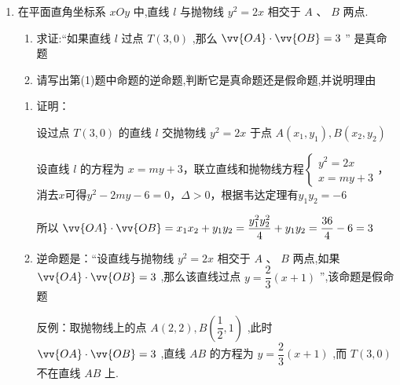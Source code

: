 \begin{enumerate}
\begin{jieda}
        设线段 ${AB}$ 的中点为 $M$ 到 $y$ 轴的距离为 $d$，由抛物线定义和梯形中位线性质可知, $2\left( {d + \dfrac{1}{4}}\right)  = \left| {AF}\right|  + \left| {BF}\right|  \geq  3$ ,即 $d \geq  \dfrac{5}{4}$ ,
        从而点 $M$ 到 $y$ 轴的最短距离为 $\dfrac{5}{4}$，此时 $A,B,F$ 三点共线
        
        故有$3 = |AB| = \dfrac{1}{sin^2\alpha}$，解得$sin\alpha = \dfrac{\sqrt{3}}{3}$，因此直线$AB$的斜率为$\pm \dfrac{\sqrt{2}}{2}$，故$AB: y = \pm \dfrac{\sqrt{2}}{2}\left(x-\dfrac{1}{2}\right)$，即${4x} - 4\sqrt{2}y - 1 = 0$ 或 ${4x} + 4\sqrt{2}y - 1 = 0$
    \end{jieda}


    \item 在平面直角坐标系 ${xOy}$ 中,直线 $l$ 与抛物线 ${y}^{2} = {2x}$ 相交于 $A\text{ 、 }B$ 两点.
    \begin{enumerate}
        \item 求证:“如果直线 $l$ 过点 $T\left( {3,0}\right)$ ,那么 $\vv{OA} \cdot  \vv{OB} = 3$ ” 是真命题
        \item 请写出第(1)题中命题的逆命题,判断它是真命题还是假命题,并说明理由
    \end{enumerate}
    \begin{jieda}
        \begin{enumerate}
            \item 证明：
            
            设过点 $T\left( {3,0}\right)$ 的直线 $l$ 交抛物线 $y^2 = {2x}$ 于点 $A\left( {{x}_{1},{y}_{1}}\right) ,B\left( {{x}_{2},{y}_{2}}\right)$ 
            
            设直线 $l$ 的方程为 $x = my+3$，联立直线和抛物线方程$\left\{  \begin{array}{l} {y}^{2} = {2x} \\  
            x = my+3 \end{array}\right.$，消去$x$可得${y}^{2} - 2my - 6 = 0$，$\Delta > 0$，根据韦达定理有${y}_{1}{y}_{2} =  - 6$

            
            所以 $\vv{OA} \cdot  \vv{OB} = {x}_{1}{x}_{2} + {y}_{1}{y}_{2} = \dfrac{y_1^2y_2^2}{4} + {y}_{1}{y}_{2} = \dfrac{36}{4} - 6 = 3$
            \item 逆命题是：“设直线与抛物线 ${y^2} = {2x}$ 相交于 $A$ 、 $B$ 两点,如果 $\vv{OA} \cdot  \vv{OB} = 3$ ,那么该直线过点 $y = \dfrac{2}{3}\left( {x + 1}\right)$ ”,该命题是假命题
            
            反例：取抛物线上的点 $A\left( {2,2}\right) ,B\left( {\dfrac{1}{2},1}\right)$ ,此时 $\vv{OA} \cdot  \vv{OB} = 3$ ,直线 ${AB}$ 的方程为 $y = \dfrac{2}{3}\left( {x + 1}\right)$ ,而 $T\left( {3,0}\right)$ 不在直线 ${AB}$ 上.
        \end{enumerate}
    \end{jieda}


\end{enumerate}
